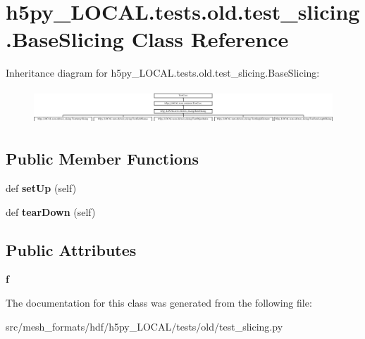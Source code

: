 \hypertarget{classh5py__LOCAL_1_1tests_1_1old_1_1test__slicing_1_1BaseSlicing}{}\section{h5py\+\_\+\+L\+O\+C\+A\+L.\+tests.\+old.\+test\+\_\+slicing.\+Base\+Slicing Class Reference}
\label{classh5py__LOCAL_1_1tests_1_1old_1_1test__slicing_1_1BaseSlicing}
Inheritance diagram for h5py\+\_\+\+L\+O\+C\+A\+L.\+tests.\+old.\+test\+\_\+slicing.\+Base\+Slicing\+:\begin{figure}[H]
\begin{center}
\leavevmode
\includegraphics[height=1.302326cm]{classh5py__LOCAL_1_1tests_1_1old_1_1test__slicing_1_1BaseSlicing}
\end{center}
\end{figure}
\subsection*{Public Member Functions}
\begin{DoxyCompactItemize}
\item 
\mbox{\label{classh5py__LOCAL_1_1tests_1_1old_1_1test__slicing_1_1BaseSlicing_adb5c7e4ec0300d0034b99f4cee1a7ed7}} 
def {\bfseries set\+Up} (self)
\item 
\mbox{\label{classh5py__LOCAL_1_1tests_1_1old_1_1test__slicing_1_1BaseSlicing_ae1c0de70ad1b636ea6e69d880b7b13bf}} 
def {\bfseries tear\+Down} (self)
\end{DoxyCompactItemize}
\subsection*{Public Attributes}
\begin{DoxyCompactItemize}
\item 
\mbox{\label{classh5py__LOCAL_1_1tests_1_1old_1_1test__slicing_1_1BaseSlicing_a978c86ab7a316b5098445b8839364ced}} 
{\bfseries f}
\end{DoxyCompactItemize}


The documentation for this class was generated from the following file\+:\begin{DoxyCompactItemize}
\item 
src/mesh\+\_\+formats/hdf/h5py\+\_\+\+L\+O\+C\+A\+L/tests/old/test\+\_\+slicing.\+py\end{DoxyCompactItemize}
